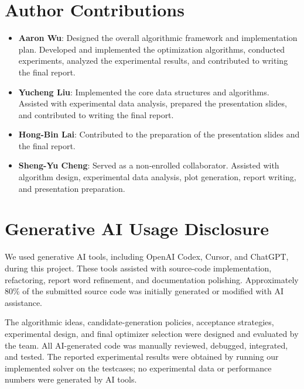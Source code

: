 \documentclass{article}
\begin{document}
\section*{Author Contributions}

\begin{itemize}
  \item \textbf{Aaron Wu}: Designed the overall algorithmic framework and implementation plan. Developed and implemented the optimization algorithms, conducted experiments, analyzed the experimental results, and contributed to writing the final report.

  \item \textbf{Yucheng Liu}: Implemented the core data structures and algorithms. Assisted with experimental data analysis, prepared the presentation slides, and contributed to writing the final report.

  \item \textbf{Hong-Bin Lai}: Contributed to the preparation of the presentation slides and the final report.

  \item \textbf{Sheng-Yu Cheng}: Served as a non-enrolled collaborator. Assisted with algorithm design, experimental data analysis, plot generation, report writing, and presentation preparation.
\end{itemize}

\vspace{-1em}
\section*{Generative AI Usage Disclosure}
\vspace{-0.5em}
We used generative AI tools, including OpenAI Codex, Cursor, and ChatGPT, during this project.
These tools assisted with source-code implementation, refactoring, report word refinement, and documentation polishing.
Approximately 80\% of the submitted source code was initially generated or modified with AI assistance.

The algorithmic ideas, candidate-generation policies, acceptance strategies, experimental design, and final optimizer selection were designed and evaluated by the team.
All AI-generated code was manually reviewed, debugged, integrated, and tested.
The reported experimental results were obtained by running our implemented solver on the testcases; no experimental data or performance numbers were generated by AI tools.

{
  \small
  
  
}
\end{document}

